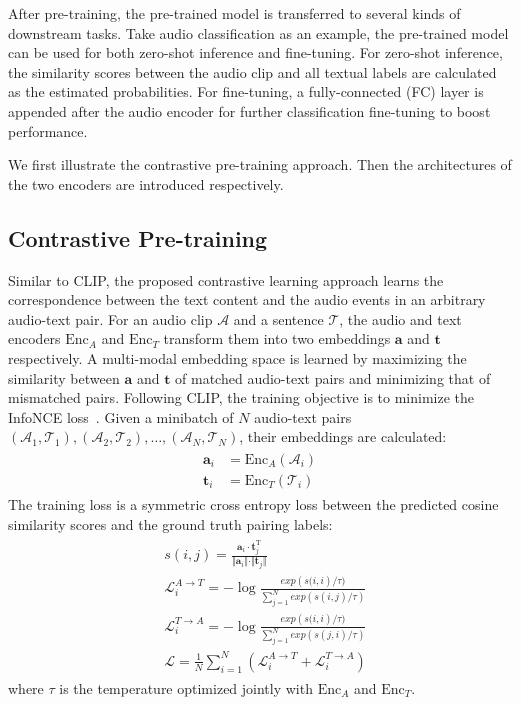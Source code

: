 \documentclass[sigconf]{acmart}
\begin{document}
After pre-training, the pre-trained model is transferred to several kinds of downstream tasks.
Take audio classification as an example, the pre-trained model can be used for both zero-shot inference and fine-tuning.
For zero-shot inference, the similarity scores between the audio clip and all textual labels are calculated as the estimated probabilities.
For fine-tuning, a fully-connected (FC) layer is appended after the audio encoder for further classification fine-tuning to boost performance.

We first illustrate the contrastive pre-training approach.
Then the architectures of the two encoders are introduced respectively.

\subsection{Contrastive Pre-training}
Similar to CLIP, the proposed contrastive learning approach learns the correspondence between the text content and the audio events in an arbitrary audio-text pair.
For an audio clip $\mathcal{A}$ and a sentence $\mathcal{T}$, the audio and text encoders $\text{Enc}_A$ and $\text{Enc}_T$ transform them into two embeddings $\mathbf{a}$ and $\mathbf{t}$ respectively.
A multi-modal embedding space is learned by maximizing the similarity between $\mathbf{a}$ and $\mathbf{t}$ of matched audio-text pairs and minimizing that of mismatched pairs.
Following CLIP, the training objective is to minimize the InfoNCE loss~\cite{van2018representation}.
Given a minibatch of $N$ audio-text pairs $(\mathcal{A}_1, \mathcal{T}_1), (\mathcal{A}_2, \mathcal{T}_2),\ldots, (\mathcal{A}_N, \mathcal{T}_N)$, their embeddings are calculated:
\begin{align*}
\begin{split}
   \mathbf{a}_i &= \text{Enc}_A (\mathcal{A}_i)\\
   \mathbf{t}_i &= \text{Enc}_T (\mathcal{T}_i)
\end{split}
\end{align*}
The training loss is a symmetric cross entropy loss between the predicted cosine similarity scores and the ground truth pairing labels:
\begin{align*}
    \begin{split}
        &s(i, j) = \frac{\mathbf{a}_i\cdot\mathbf{t}_j^{\mathrm{T}}}{
        \Vert \mathbf{a}_i \Vert \cdot \Vert \mathbf{t}_j \Vert
        }\\
        &\mathcal{L}_i^{A \rightarrow T} = -\log \frac{exp\left(s(i, i\right) / \tau )}{\sum_{j=1}^N exp(s\left(i, j\right) / \tau)}\\
        &\mathcal{L}_i^{T \rightarrow A} = -\log \frac{exp\left(s(i, i\right) / \tau )}{\sum_{j=1}^N exp(s\left(j, i\right) / \tau)}\\
        &\mathcal{L} = \frac{1}{N}\sum_{i=1}^N(\mathcal{L}_i^{A \rightarrow T} + \mathcal{L}_i^{T \rightarrow A})
    \end{split}
\end{align*}
where $\tau$ is the temperature optimized jointly with $\text{Enc}_A$ and $\text{Enc}_T$.
\end{document}
